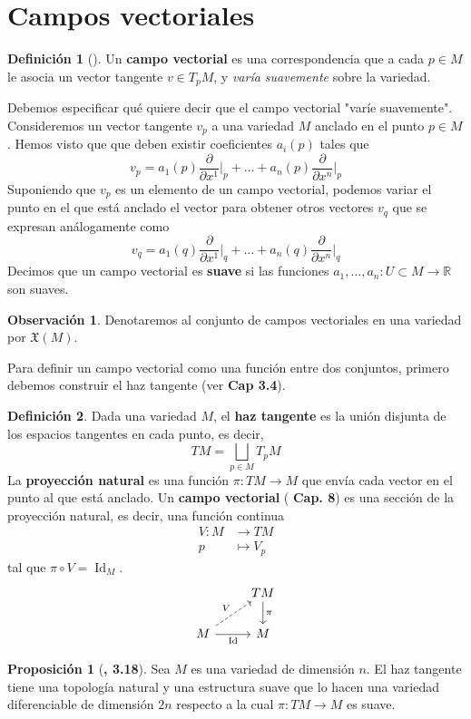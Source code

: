 \documentclass[spanish]{book}
\theoremstyle{definition}
\newtheorem*{defn}{Definición}
\newtheorem*{prop}{Proposición}
\newtheorem*{obs}{Observación}
\newcommand{\R}{\mathbb{R}}
\DeclareMathOperator{\Id}{Id}
\begin{document}
	\section{Campos vectoriales}
	\begin{defn}[\cite{ONeill}]
		Un \textbf{campo vectorial} es una correspondencia que a cada $p\in M$ le asocia un vector tangente $v\in T_pM$, y \textit{varía suavemente} sobre la variedad.
	\end{defn}
	Debemos especificar qué quiere decir que el campo vectorial "varíe suavemente". Consideremos un vector tangente $v_p$ a una variedad $M$ anclado en el punto $p\in M$. Hemos visto que que deben existir coeficientes $a_i(p)$ tales que
	\[v_p=a_1(p)\frac{\partial}{\partial x^1}\Big|_p+\ldots+a_n(p)\frac{\partial}{\partial x^n}\Big|_p\]
	Suponiendo que $v_p$ es un elemento de un campo vectorial, podemos variar el punto en el que está anclado el vector para obtener otros vectores $v_q$ que se expresan análogamente como
	\[v_q=a_1(q)\frac{\partial}{\partial x^1}\Big|_q+\ldots+a_n(q)\frac{\partial}{\partial x^n}\Big|_q\]
	Decimos que un campo vectorial es \textbf{suave} si las funciones $a_1,\ldots,a_n:U\subset M\to\R$ son suaves.
	\begin{obs}
		Denotaremos al conjunto de campos vectoriales en una variedad por $\mathfrak{X}(M)$.
	\end{obs}
	Para definir un campo vectorial como una función entre dos conjuntos, primero debemos construir el haz tangente (ver \cite{Lee} \textbf{Cap 3.4}).
	\begin{defn}
		Dada una variedad $M$, el \textbf{haz tangente} es la unión disjunta de los espacios tangentes en cada punto, es decir,
		\[TM=\bigsqcup_{p\in M}T_pM\]
		La \textbf{proyección natural} es una función $\pi:TM\to M$ que envía cada vector en el punto al que está anclado.
		Un \textbf{campo vectorial} (\cite{Lee} \textbf{Cap. 8}) es una sección de la proyección natural, es decir, una función continua
		\begin{align*}
			V:M&\to TM\\
			p&\mapsto V_p
		\end{align*}
		tal que $\pi\circ V=\Id_M$.
		\[\begin{tikzcd}
			&TM\arrow{d}{\pi}\\
			M\arrow[dashed]{ur}{V}\arrow[swap]{r}{\Id}&M
		\end{tikzcd}\]
	\end{defn}
	\begin{prop}[\cite{Lee}\textbf{, 3.18}]
		Sea $M$ es una variedad de dimensión $n$. El haz tangente tiene una topología natural y una estructura suave que lo hacen una variedad diferenciable de dimensión $2n$ respecto a la cual $\pi:TM\to M$ es suave.
	\end{prop}
\end{document}
